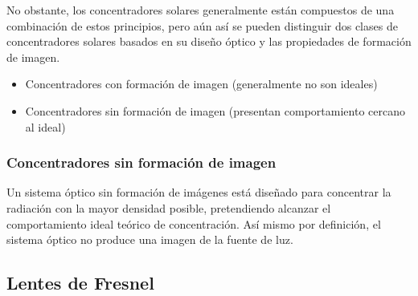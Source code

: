 		No obstante, los concentradores solares generalmente están compuestos de una combinación de estos principios, pero aún así se pueden distinguir dos clases de concentradores solares basados en su diseño óptico y las propiedades de formación de imagen.

		\begin{itemize}
			\item Concentradores con formación de imagen (generalmente no son ideales)
			\item Concentradores sin formación de imagen (presentan comportamiento cercano al ideal)
		\end{itemize}
		
		\subsubsection{Concentradores sin formación de imagen}
			
			Un sistema óptico sin formación de imágenes está diseñado para concentrar la radiación con la mayor densidad posible, pretendiendo alcanzar el comportamiento ideal teórico de concentración. Así mismo por definición, el sistema óptico no produce una imagen de la fuente de luz.
	
	 \subsection{Lentes de Fresnel}
	 	
	 	